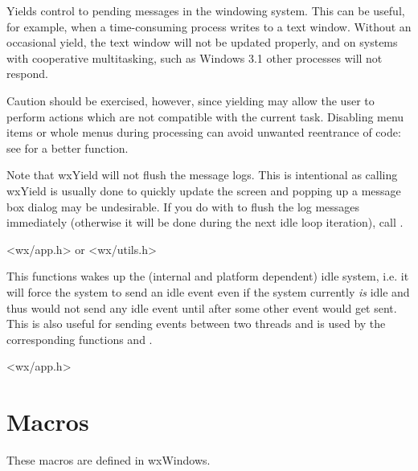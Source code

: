 
Yields control to pending messages in the windowing system. This can be useful, for example, when a
time-consuming process writes to a text window. Without an occasional
yield, the text window will not be updated properly, and on systems with
cooperative multitasking, such as Windows 3.1 other processes will not respond.

Caution should be exercised, however, since yielding may allow the
user to perform actions which are not compatible with the current task.
Disabling menu items or whole menus during processing can avoid unwanted
reentrance of code: see  for a better
function.

Note that wxYield will not flush the message logs. This is intentional as
calling wxYield is usually done to quickly update the screen and popping up a
message box dialog may be undesirable. If you do with to flush the log
messages immediately (otherwise it will be done during the next idle loop
iteration), call .


<wx/app.h> or <wx/utils.h>

\label{wxwakeupidle}


This functions wakes up the (internal and platform dependent) idle system, i.e. it
will force the system to send an idle event even if the system currently {\it is}
 idle and thus would not send any idle event until after some other event would get
sent. This is also useful for sending events between two threads and is used by
the corresponding functions  and 
.


<wx/app.h>

\section{Macros}\label{macros}

These macros are defined in wxWindows.

\label{intswapalways}



